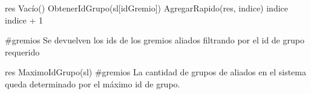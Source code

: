 {
 	\state res \asig Vac\'io() 
 	\state {} 					
 	\state 	{} \asig ObtenerIdGrupo(sl[idGremio])					
 	\state 	
 						
 		\state {}					
		  \state AgregarRapido(res, indice)					
		\endif
 		\state
 		\state indice \asig indice + 1					
 	\endwhile

}
{\#gremios}
{ Se devuelven los ids de los gremios aliados filtrando por el id de grupo requerido}


{
	\state res \asig MaximoIdGrupo(sl)						
}
{\#gremios}
{La cantidad de grupos de aliados en el sistema queda determinado por el m\'aximo id de grupo.}

% 
% 		
% 		
% 
% 


